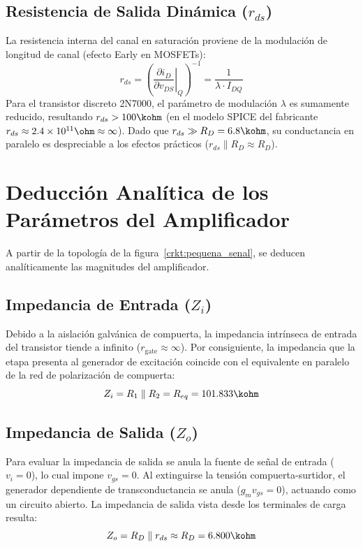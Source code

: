\subsection{Resistencia de Salida Dinámica (\texorpdfstring{$r_{ds}$}{rds})}
La resistencia interna del canal en saturación proviene de la modulación de longitud de canal (efecto Early en MOSFETs):
\begin{equation}
  r_{ds} = \left(\left.\frac{\partial i_D}{\partial v_{DS}}\right|_{Q}\right)^{-1} = \frac{1}{\lambda \cdot I_{DQ}}
\end{equation}
Para el transistor discreto 2N7000, el parámetro de modulación $\lambda$ es sumamente reducido, resultando
$r_{ds} > 100\kohm$ (en el modelo SPICE del fabricante $r_{ds} \approx 2.4 \times 10^{11}\ohm \approx \infty$). Dado que
$r_{ds} \gg R_D = 6.8\kohm$, su conductancia en paralelo es despreciable a los efectos prácticos ($r_{ds} \parallel R_D \approx R_D$).

\section{Deducción Analítica de los Parámetros del Amplificador}

A partir de la topología de la figura~\ref{crkt:pequena_senal}, se deducen analíticamente las magnitudes del amplificador.

\subsection{Impedancia de Entrada (\texorpdfstring{$Z_i$}{Zi})}
Debido a la aislación galvánica de compuerta, la impedancia intrínseca de entrada del transistor tiende a infinito
($r_{\mathrm{gate}} \approx \infty$). Por consiguiente, la impedancia que la etapa presenta al generador de excitación
coincide con el equivalente en paralelo de la red de polarización de compuerta:
\begin{equation}
  Z_i = R_1 \parallel R_2 = R_{eq} = 101.833\kohm
  \label{eq:Zi_analitica}
\end{equation}

\subsection{Impedancia de Salida (\texorpdfstring{$Z_o$}{Zo})}
Para evaluar la impedancia de salida se anula la fuente de señal de entrada ($v_i = 0$), lo cual impone $v_{gs} = 0$.
Al extinguirse la tensión compuerta-surtidor, el generador dependiente de transconductancia se anula ($g_m v_{gs} = 0$),
actuando como un circuito abierto. La impedancia de salida vista desde los terminales de carga resulta:
\begin{equation}
  Z_o = R_D \parallel r_{ds} \approx R_D = 6.800\kohm
  \label{eq:Zo_analitica}
\end{equation}

